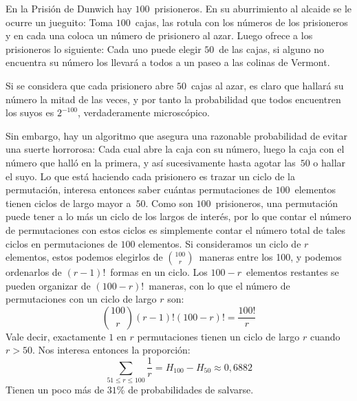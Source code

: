   \begin{example}
    En la Prisión de Dunwich hay \(100\)~prisioneros.
    En su aburrimiento al alcaide se le ocurre un jueguito:
    Toma \(100\)~cajas,
    las rotula con los números de los prisioneros
    y en cada una coloca un número de prisionero al azar.
    Luego ofrece a los prisioneros lo siguiente:
    Cada uno puede elegir \(50\)~de las cajas,
    si alguno no encuentra su número
    los llevará a todos a un paseo a las colinas de Vermont.

    Si se considera que cada prisionero abre \(50\)~cajas al azar,
    es claro que hallará su número la mitad de las veces,
    y por tanto la probabilidad que todos encuentren los suyos
    es \(2^{-100}\),
    verdaderamente microscópico.

    Sin embargo,
    hay un algoritmo que asegura una razonable probabilidad
    de evitar una suerte horrorosa:
    Cada cual abre la caja con su número,
    luego la caja con el número que halló en la primera,
    y así sucesivamente hasta agotar las~\(50\) o hallar el suyo.
    Lo que está haciendo cada prisionero
    es trazar un ciclo de la permutación,
    interesa entonces saber
    cuántas permutaciones de \(100\)~elementos
    tienen ciclos de largo mayor a~\(50\).
    Como son \(100\)~prisioneros,
    una permutación
    puede tener a lo más un ciclo de los largos de interés,
    por lo que contar el número de permutaciones con estos ciclos
    es simplemente contar el número total de tales ciclos
    en permutaciones de \(100\) elementos.
    Si consideramos un ciclo de \(r\) elementos,
    estos podemos elegirlos
    de \(\binom{100}{r}\)~maneras entre los 100,
    y podemos ordenarlos de \((r - 1)!\)~formas en un ciclo.
    Los \(100 - r\)~elementos restantes
    se pueden organizar de \((100 - r)!\)~maneras,
    con lo que el número de permutaciones
    con un ciclo de largo \(r\) son:
    \begin{equation*}
      \binom{100}{r} (r - 1)! (100 - r)!
	= \frac{100!}{r}
    \end{equation*}
    Vale decir,
    exactamente \(1\) en \(r\)
    permutaciones tienen un ciclo de largo \(r\)
    cuando \(r > 50\).
    Nos interesa entonces la proporción:
    \begin{equation*}
      \sum_{51 \le r \le 100} \frac{1}{r}
	= H_{100} - H_{50}
	\approx 0,6882
    \end{equation*}
    Tienen un poco más de \(31\)\% de probabilidades
    de salvarse.
  \end{example}

